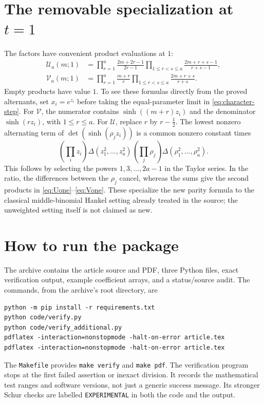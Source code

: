 \documentclass[11pt]{article}
\theoremstyle{definition}
\theoremstyle{remark}
\newcommand{\U}{\mathcal U}
\newcommand{\V}{\mathcal V}
\newcommand{\Dlt}{\Delta}
\theoremstyle{definition}
\theoremstyle{plain}
\numberwithin{equation}{section}
\begin{document}
\appendix
\section{The removable specialization at \texorpdfstring{$t=1$}{t=1}}
\label{app:one}

The factors have convenient product evaluations at $1$:
\begin{align}
 \U_a(m;1)&=
 \prod_{r=1}^a\frac{2m+2r-1}{2r-1}
 \prod_{1\le r<s\le a}\frac{2m+r+s-1}{r+s-1},\label{eq:Uone}\\
 \V_a(m;1)&=
 \prod_{r=1}^a\frac{m+r}{r}
 \prod_{1\le r<s\le a}\frac{2m+r+s}{r+s}.
 \label{eq:Vone}
\end{align}
Empty products have value $1$.
To see these formulas directly from the proved alternants, set
$x_i=e^{z_i}$ before taking the equal-parameter limit in
\eqref{eq:character-step}. For $\V$, the numerator contains
$\sinh((m+r)z_i)$ and the denominator $\sinh(rz_i)$, with $1\le r\le a$.
For $\U$, replace $r$ by $r-\tfrac12$.
The lowest nonzero alternating term of
$\det(\sinh(\rho_j z_i))$ is a common nonzero constant times
\[
 \left(\prod_i z_i\right)\Dlt(z_1^2,\ldots,z_a^2)
 \left(\prod_j\rho_j\right)\Dlt(\rho_1^2,\ldots,\rho_a^2).
\]
This follows by selecting the powers $1,3,\ldots,2a-1$ in the Taylor
series. In the ratio, the differences between the $\rho_j$ cancel,
whereas the sums give the second products in
\eqref{eq:Uone}--\eqref{eq:Vone}. These specialize the new parity formula
to the classical middle-binomial Hankel setting already treated in the
source; the unweighted setting itself is not claimed as new.

\clearpage
\section{How to run the package}

The archive contains the article source and PDF, three Python files, exact
verification output, example coefficient arrays, and a status/source audit.
The commands, from the archive's root directory, are
\begin{verbatim}
python -m pip install -r requirements.txt
python code/verify.py
python code/verify_additional.py
pdflatex -interaction=nonstopmode -halt-on-error article.tex
pdflatex -interaction=nonstopmode -halt-on-error article.tex
\end{verbatim}
The \texttt{Makefile} provides \texttt{make verify} and \texttt{make pdf}.
The verification program stops at the first failed assertion or inexact
division. It records the mathematical test ranges and software versions,
not just a generic success message. Its stronger Schur checks are labelled
\texttt{EXPERIMENTAL} in both the code and the output.
\end{document}
